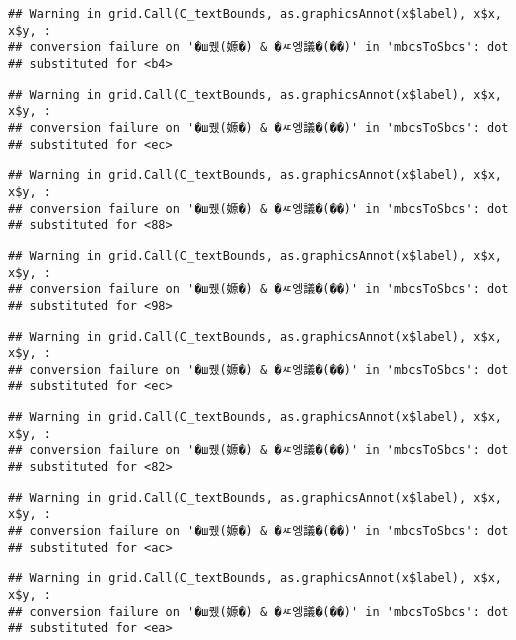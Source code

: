 \documentclass[
]{article}
\begin{document}
\begin{verbatim}
## Warning in grid.Call(C_textBounds, as.graphicsAnnot(x$label), x$x, x$y, :
## conversion failure on '�ш퀬(嫄�) & �ㅼ엥議�(��)' in 'mbcsToSbcs': dot
## substituted for <b4>
\end{verbatim}

\begin{verbatim}
## Warning in grid.Call(C_textBounds, as.graphicsAnnot(x$label), x$x, x$y, :
## conversion failure on '�ш퀬(嫄�) & �ㅼ엥議�(��)' in 'mbcsToSbcs': dot
## substituted for <ec>
\end{verbatim}

\begin{verbatim}
## Warning in grid.Call(C_textBounds, as.graphicsAnnot(x$label), x$x, x$y, :
## conversion failure on '�ш퀬(嫄�) & �ㅼ엥議�(��)' in 'mbcsToSbcs': dot
## substituted for <88>
\end{verbatim}

\begin{verbatim}
## Warning in grid.Call(C_textBounds, as.graphicsAnnot(x$label), x$x, x$y, :
## conversion failure on '�ш퀬(嫄�) & �ㅼ엥議�(��)' in 'mbcsToSbcs': dot
## substituted for <98>
\end{verbatim}

\begin{verbatim}
## Warning in grid.Call(C_textBounds, as.graphicsAnnot(x$label), x$x, x$y, :
## conversion failure on '�ш퀬(嫄�) & �ㅼ엥議�(��)' in 'mbcsToSbcs': dot
## substituted for <ec>
\end{verbatim}

\begin{verbatim}
## Warning in grid.Call(C_textBounds, as.graphicsAnnot(x$label), x$x, x$y, :
## conversion failure on '�ш퀬(嫄�) & �ㅼ엥議�(��)' in 'mbcsToSbcs': dot
## substituted for <82>
\end{verbatim}

\begin{verbatim}
## Warning in grid.Call(C_textBounds, as.graphicsAnnot(x$label), x$x, x$y, :
## conversion failure on '�ш퀬(嫄�) & �ㅼ엥議�(��)' in 'mbcsToSbcs': dot
## substituted for <ac>
\end{verbatim}

\begin{verbatim}
## Warning in grid.Call(C_textBounds, as.graphicsAnnot(x$label), x$x, x$y, :
## conversion failure on '�ш퀬(嫄�) & �ㅼ엥議�(��)' in 'mbcsToSbcs': dot
## substituted for <ea>
\end{verbatim}
\end{document}
